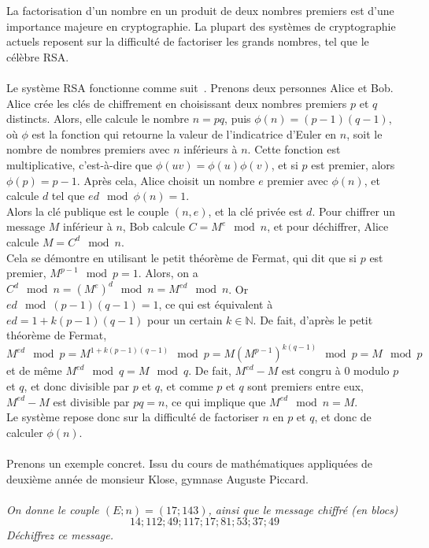 La factorisation d'un nombre en un produit de deux nombres premiers est d'une importance
majeure en cryptographie.
La plupart des systèmes de cryptographie actuels reposent sur la difficulté de factoriser
les grands nombres, tel que le célèbre RSA.\\ \\
Le système RSA fonctionne comme suit~\cite{wiki:rsa}.
Prenons deux personnes Alice et Bob.
Alice crée les clés de chiffrement en choisissant deux nombres premiers $p$ et $q$ distincts.
Alors, elle calcule le nombre $n = pq$, puis $\phi (n) = (p-1)(q-1)$, où $\phi$ est la fonction
qui retourne la valeur de l'indicatrice d'Euler en $n$, soit le nombre de nombres premiers
avec $n$ inférieurs à $n$.
Cette fonction est multiplicative, c'est-à-dire que $\phi (uv) = \phi (u) \phi (v)$, et si $p$ est
premier, alors $\phi (p) = p-1$.
Après cela, Alice choisit un nombre $e$ premier avec $\phi (n)$, et calcule $d$ tel que
$ed \mod \phi (n) = 1$.\\
Alors la clé publique est le couple $(n, e)$, et la clé privée est $d$.
Pour chiffrer un message $M$ inférieur à $n$, Bob calcule $C = M^e \mod n$, et pour déchiffrer,
Alice calcule $M = C^d \mod n$.\\
Cela se démontre en utilisant le petit théorème de Fermat, qui dit que si $p$ est premier,
$M^{p-1} \mod p = 1$.
Alors, on a $C^d \mod n = (M^e)^d \mod n = M^{ed} \mod n$.
Or $ed \mod (p-1)(q-1) = 1$, ce qui est équivalent à $ed = 1 + k(p-1)(q-1)$ pour un certain
$k \in \mathbb{N}$.
De fait, d'après le petit théorème de Fermat, $M^{ed} \mod p = M^{1+k(p-1)(q-1)} \mod p = M (M^{p-1})^{k(q-1)} \mod p = M \mod p$
et de même $M^{ed} \mod q = M \mod q$.
De fait, $M^{ed} - M$ est congru à 0 modulo $p$ et $q$, et donc divisible par $p$ et $q$, et
comme $p$ et $q$ sont premiers entre eux, $M^{ed} - M$ est divisible par $pq = n$,
ce qui implique que $M^{ed} \mod n = M$.\\
Le système repose donc sur la difficulté de factoriser $n$ en $p$ et $q$, et donc de  calculer
$\phi (n)$.\\ \\
Prenons un exemple concret.
Issu du cours de mathématiques appliquées de deuxième année de monsieur Klose, gymnase Auguste
Piccard.\\ \\
\textit{On donne le couple $(E;n) = (17;143)$, ainsi que le message chiffré (en blocs)
$$14;112;49;117;17;81;53;37;49$$ Déchiffrez ce message.}\\ \\
